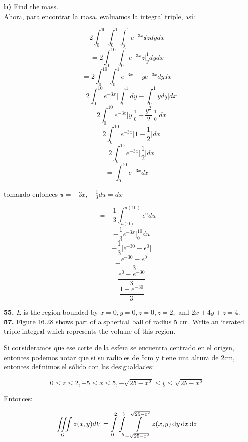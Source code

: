 \documentclass[11pt]{report}
\begin{document}
\textbf{b)} Find the mass. \\

	Ahora, para encontrar la masa, evaluamos la integral triple, así:

	$$ 2 \int_{0}^{10}\int_{0}^{1}\int_{y}^{1} e^{-3x} dz dy dx  $$
	$$ =  2 \int_{0}^{10}\int_{0}^{1} e^{-3x} z \Big|_{y}^{1} dy dx  $$
	$$ =  2 \int_{0}^{10}\int_{0}^{1} e^{-3x} - ye^{-3x}  dy dx  $$
	$$ =  2 \int_{0}^{10} e^{-3x} \Big[\int_{0}^{1} dy - \int_{0}^{1} y dy \Big] dx  $$
	$$ =  2 \int_{0}^{10} e^{-3x} \Big[ y \Big|_{0}^{1} - \frac{y^2}{2} \Big|_{0}^{1} \Big] dx  $$
	$$ =  2 \int_{0}^{10} e^{-3x} \Big[ 1 - \frac{1}{2} \Big] dx  $$
	$$ =  2 \int_{0}^{10} e^{-3x} \Big[ \frac{1}{2} \Big] dx  $$
	$$ =  \int_{0}^{10} e^{-3x} dx  $$

tomando entonces $u = -3x$, $ - \frac{1}{3} du = dx$

	$$ = - \frac{1}{3} \int_{u(0)}^{u(10)} e^{u} du  $$
	$$ = - \frac{1}{3}  e^{-3x} \Big|_{0}^{10} du  $$
	$$ = - \frac{1}{3} \Big[ e^{-30} - e^0 \Big]  $$
	$$ = - \frac{ e^{-30} - e^0  }{3}  $$
	$$ = \frac{ e^0 - e^{-30} }{3}  $$
	$$ = \frac{ 1 - e^{-30} }{3}  $$


\textbf{55.} $E$ is the region bounded by $x = 0, y = 0, z = 0, z = 2,$
and $2x + 4y + z = 4$. \\

\textbf{57.} Figure 16.28 shows part of a spherical ball of radius 5 cm.
Write an iterated triple integral which represents the volume of this region. \\

\begin{figure}[h]
\centering
\end{figure}

Si consideramos que ese corte de la esfera se encuentra centrado en el origen,
entonces podemos notar que si su radio es de 5cm y tiene una altura de 2cm,
entonces definimos el sólido con las desigualdades:

\[ 0 \leq z \leq 2, -5 \leq x \leq 5, - \sqrt{25 - x^2} \leq y \leq \sqrt{25 - x^2}\]

Entonces:

\[ \iiint \limits_G z(x,y) dV = \int \limits_0^2 \int \limits_{-5}^5
        \int \limits_{- \sqrt{25 - x^2}}^{\sqrt{25 - x^2}} z(x,y) \, \text dy \, \text dx \, \text dz  \]
\end{document}
